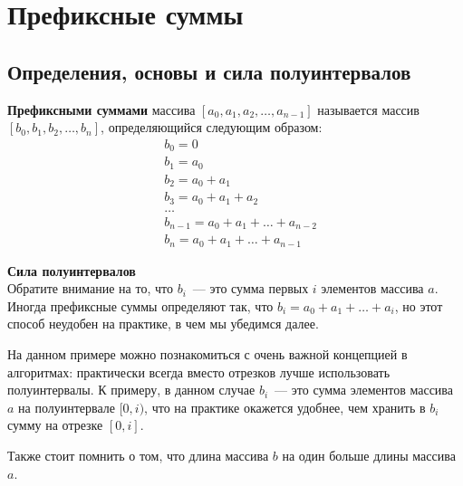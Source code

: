 \chapter{Префиксные суммы}




\section{Определения, основы и сила полуинтервалов}

\begin{definition}
    \textbf{Префиксными суммами} массива $[a_0, a_1, a_2, \ldots, a_{n - 1}]$ называется массив $[b_0, b_1, b_2, \ldots, b_n]$, определяющийся следующим образом:
\begin{align*}
&    b_0 = 0\\
&    b_1 = a_0\\
&    b_2 = a_0 + a_1\\
&    b_3 = a_0 + a_1 + a_2\\
&    \ldots\\
&    b_{n - 1} = a_0 + a_1 + \ldots + a_{n - 2}\\
&    b_n = a_0 + a_1 + \ldots + a_{n - 1}
\end{align*}
\end{definition}

\begin{observation} \textbf{Сила полуинтервалов}\\
    Обратите внимание на то, что $b_i$~--- это сумма первых $i$ элементов массива $a$. Иногда префиксные суммы определяют так, что $b_i = a_0 + a_1 + \ldots + a_i$, но этот способ неудобен на практике, в чем мы убедимся далее.

    На данном примере можно познакомиться с очень важной концепцией в алгоритмах: практически всегда вместо отрезков лучше использовать полуинтервалы. К примеру, в данном случае $b_i$~--- это сумма элементов массива $a$ на полуинтервале $[0, i)$, что на практике окажется удобнее, чем хранить в $b_i$ сумму на отрезке $[0, i]$.
\end{observation}

\begin{observation}
    Также стоит помнить о том, что длина массива $b$ на один больше длины массива $a$.
\end{observation}

